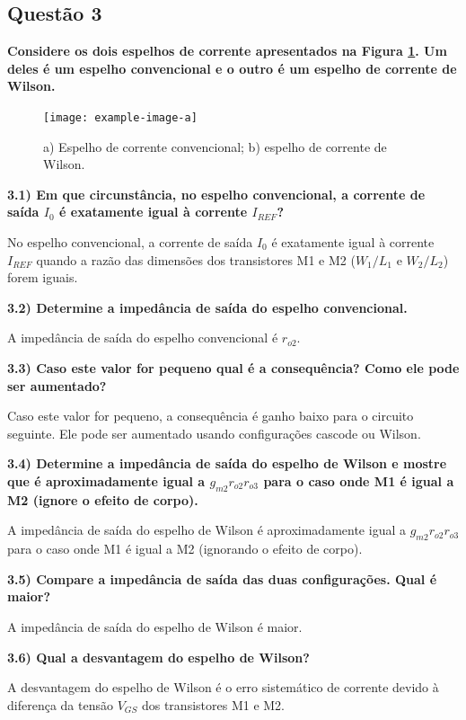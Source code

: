 \documentclass[12pt,a4paper]{article}
\begin{document}
\subsection*{Questão 3}

\textbf{Considere os dois espelhos de corrente apresentados na Figura \ref{fig:espelhos_corrente}. Um deles é um espelho convencional e o outro é um espelho de corrente de Wilson.}

\begin{figure}[H]
    \centering
    \texttt{[image: example-image-a]}
    \caption{a) Espelho de corrente convencional; b) espelho de corrente de Wilson.}
    \label{fig:espelhos_corrente}
\end{figure}

\textbf{3.1) Em que circunstância, no espelho convencional, a corrente de saída $I_0$ é exatamente igual à corrente $I_{REF}$?}

No espelho convencional, a corrente de saída $I_0$ é exatamente igual à corrente $I_{REF}$ quando a razão das dimensões dos transistores M1 e M2 ($W_1/L_1$ e $W_2/L_2$) forem iguais.

\textbf{3.2) Determine a impedância de saída do espelho convencional.}

A impedância de saída do espelho convencional é $r_{o2}$.

\textbf{3.3) Caso este valor for pequeno qual é a consequência? Como ele pode ser aumentado?}

Caso este valor for pequeno, a consequência é ganho baixo para o circuito seguinte. Ele pode ser aumentado usando configurações cascode ou Wilson.

\textbf{3.4) Determine a impedância de saída do espelho de Wilson e mostre que é aproximadamente igual a $g_{m2} r_{o2} r_{o3}$ para o caso onde M1 é igual a M2 (ignore o efeito de corpo).}

A impedância de saída do espelho de Wilson é aproximadamente igual a $g_{m2} r_{o2} r_{o3}$ para o caso onde M1 é igual a M2 (ignorando o efeito de corpo).

\textbf{3.5) Compare a impedância de saída das duas configurações. Qual é maior?}

A impedância de saída do espelho de Wilson é maior.

\textbf{3.6) Qual a desvantagem do espelho de Wilson?}

A desvantagem do espelho de Wilson é o erro sistemático de corrente devido à diferença da tensão $V_{GS}$ dos transistores M1 e M2.
\end{document}
